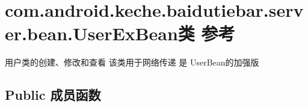 \hypertarget{classcom_1_1android_1_1keche_1_1baidutiebar_1_1server_1_1bean_1_1_user_ex_bean}{}\section{com.\+android.\+keche.\+baidutiebar.\+server.\+bean.\+User\+Ex\+Bean类 参考}
\label{classcom_1_1android_1_1keche_1_1baidutiebar_1_1server_1_1bean_1_1_user_ex_bean}


用户类的创建、修改和查看 该类用于网络传递 是 User\+Bean的加强版  


\subsection*{Public 成员函数}
